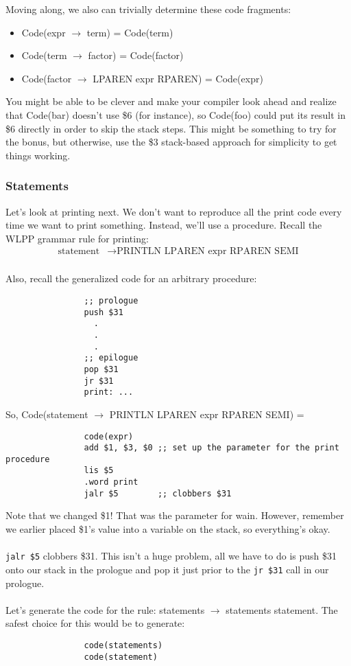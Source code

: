 \documentclass[]{article}
\theoremstyle{definition}
\begin{document}
				Moving along, we also can trivially determine these code fragments:
				\begin{itemize}
					\item Code(expr $\to$ term) = Code(term)
					\item Code(term $\to$ factor) = Code(factor)
					\item Code(factor $\to$ LPAREN expr RPAREN) = Code(expr)
				\end{itemize}

				You might be able to be clever and make your compiler look ahead and realize that Code(bar) doesn't use \$6 (for instance), so Code(foo) could put its result in \$6 directly in order to skip the stack steps. This might be something to try for the bonus, but otherwise, use the \$3 stack-based approach for simplicity to get things working.
			
			\subsubsection{Statements}
				Let's look at printing next. We don't want to reproduce all the print code every time we want to print something. Instead, we'll use a procedure. Recall the WLPP grammar rule for printing:
				\begin{align*}
					\text{statement} &\to \text{PRINTLN LPAREN expr RPAREN SEMI} \\
				\end{align*}

				Also, recall the generalized code for an arbitrary procedure:
				\begin{verbatim}
				;; prologue
				push $31
				  .
				  .
				  .
				;; epilogue
				pop $31
				jr $31
				print: ...
				\end{verbatim}

				So, Code(statement $\to$ PRINTLN LPAREN expr RPAREN SEMI) =
				\begin{verbatim}
				code(expr)
				add $1, $3, $0 ;; set up the parameter for the print procedure
				lis $5
				.word print
				jalr $5        ;; clobbers $31
				\end{verbatim}

				Note that we changed \$1! That was the parameter for wain. However, remember we earlier placed \$1's value into a variable on the stack, so everything's okay.
				\\ \\
				\verb+jalr $5+ clobbers \$31. This isn't a huge problem, all we have to do is push \$31 onto our stack in the prologue and pop it just prior to the \verb+jr $31+ call in our prologue.
				\\ \\
				Let's generate the code for the rule: statements $\to$ statements statement. The safest choice for this would be to generate:
				\begin{verbatim}
				code(statements)
				code(statement)
				\end{verbatim}
\end{document}
